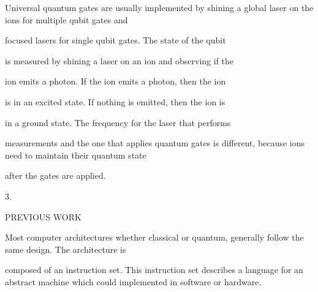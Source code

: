 \documentclass[a4paper,portrait,12pt]{article}
\begin{document}
\begin{flushleft}
Universal quantum gates are usually implemented by shining a global laser on the ions for multiple qubit gates and
\end{flushleft}


\begin{flushleft}
focused lasers for single qubit gates. The state of the qubit
\end{flushleft}


\begin{flushleft}
is measured by shining a laser on an ion and observing if the
\end{flushleft}


\begin{flushleft}
ion emits a photon. If the ion emits a photon, then the ion
\end{flushleft}


\begin{flushleft}
is in an excited state. If nothing is emitted, then the ion is
\end{flushleft}


\begin{flushleft}
in a ground state. The frequency for the laser that performs
\end{flushleft}


\begin{flushleft}
measurements and the one that applies quantum gates is different, because ions need to maintain their quantum state
\end{flushleft}


\begin{flushleft}
after the gates are applied.
\end{flushleft}





3.





\begin{flushleft}
PREVIOUS WORK
\end{flushleft}





\begin{flushleft}
Most computer architectures whether classical or quantum, generally follow the same design. The architecture is
\end{flushleft}


\begin{flushleft}
composed of an instruction set. This instruction set describes a language for an abstract machine which could implemented in software or hardware.
\end{flushleft}
\end{document}
